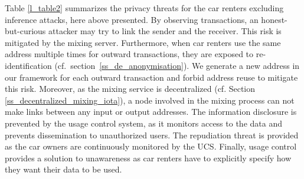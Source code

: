 \begin{table}[h]
    \caption{Threats to privacy and their mitigation}
    \label{l_table2}
  \end{table}
Table \ref{l_table2} summarizes the privacy threats for the car renters excluding inference attacks, here above presented. By observing transactions, an honest-but-curious attacker may try to link the sender and the receiver. This risk is mitigated by the mixing server. Furthermore, when car renters use the same address multiple times for outward transactions, they are exposed to re-identification (cf.~section~\ref{ss_de_anonymisation}). We generate a new address in our framework for each outward transaction and forbid address reuse to mitigate this risk. Moreover, as the mixing service is decentralized (cf. Section \ref{ss_decentralized_mixing_iota}), a node involved in the mixing process can not make links between any input or output addresses. The information disclosure is prevented by the usage control system, as it monitors access to the data and prevents dissemination to unauthorized users. The repudiation threat is provided as the car owners are continuously monitored by the UCS. Finally, usage control provides a solution to unawareness as car renters have to explicitly specify how they want their data to be used. 

